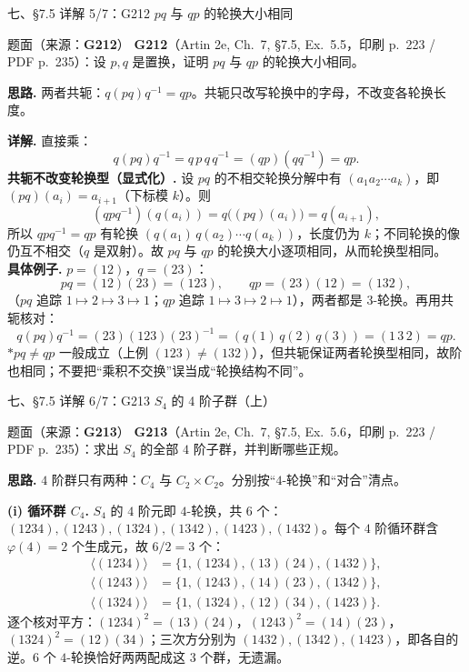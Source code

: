\documentclass[aspectratio=169,10pt,fontset=none]{ctexbeamer}
\newcommand{\ex}[1]{\textcolor{accent}{\footnotesize\bfseries #1}}
\newcommand{\key}[1]{\textcolor{ink}{\bfseries #1}}
\newcommand{\starpt}{\textcolor{accent}{\bfseries$\ast$}}
\begin{document}
\begin{frame}[t]{七、\S7.5 详解 5/7：G212 $pq$ 与 $qp$ 的轮换大小相同}
\label{ex:G212}
\scriptsize
\begin{block}{\footnotesize 题面（来源：\ex{G212}）}
\scriptsize
\ex{G212}（Artin 2e, Ch.~7, \S7.5, Ex.~5.5，印刷 p.~223 / PDF p.~235）：设 $p,q$ 是置换，证明 $pq$ 与 $qp$ 的轮换大小相同。
\end{block}
\key{思路.} 两者共轭：$q(pq)q^{-1}=qp$。共轭只改写轮换中的字母，不改变各轮换长度。

\key{详解.} 直接乘：
\[ q(pq)q^{-1}=q\,p\,q\,q^{-1}=(qp)(qq^{-1})=qp. \]
\key{共轭不改变轮换型（显式化）.} 设 $pq$ 的不相交轮换分解中有 $(a_1a_2\cdots a_k)$，即 $(pq)(a_i)=a_{i+1}$（下标模 $k$）。则
\[ (qpq^{-1})(q(a_i))=q\bigl((pq)(a_i)\bigr)=q(a_{i+1}), \]
所以 $qpq^{-1}=qp$ 有轮换 $(q(a_1)\,q(a_2)\cdots q(a_k))$，长度仍为 $k$；不同轮换的像仍互不相交（$q$ 是双射）。故 $pq$ 与 $qp$ 的轮换大小逐项相同，从而轮换型相同。\\
\key{具体例子.} $p=(12)$，$q=(23)$：
\[ pq=(12)(23)=(123),\qquad qp=(23)(12)=(132), \]
（$pq$ 追踪 $1\mapsto2\mapsto3\mapsto1$；$qp$ 追踪 $1\mapsto3\mapsto2\mapsto1$），两者都是 $3$-轮换。再用共轭核对：
\[ q(pq)q^{-1}=(23)(123)(23)^{-1}=(q(1)\,q(2)\,q(3))=(1\,3\,2)=qp. \]
\starpt $pq\ne qp$ 一般成立（上例 $(123)\ne(132)$），但共轭保证两者轮换型相同，故阶也相同；不要把“乘积不交换”误当成“轮换结构不同”。
\end{frame}

\begin{frame}[t]{七、\S7.5 详解 6/7：G213 $S_4$ 的 4 阶子群（上）}
\label{ex:G213}
\scriptsize
\begin{block}{\footnotesize 题面（来源：\ex{G213}）}
\scriptsize
\ex{G213}（Artin 2e, Ch.~7, \S7.5, Ex.~5.6，印刷 p.~223 / PDF p.~235）：求出 $S_4$ 的全部 $4$ 阶子群，并判断哪些正规。
\end{block}
\key{思路.} $4$ 阶群只有两种：$C_4$ 与 $C_2\times C_2$。分别按“$4$-轮换”和“对合”清点。

\key{(i) 循环群 $C_4$.} $S_4$ 的 $4$ 阶元即 $4$-轮换，共 $6$ 个：$(1234),(1243),(1324),(1342),(1423),(1432)$。每个 $4$ 阶循环群含 $\varphi(4)=2$ 个生成元，故 $6/2=3$ 个：
\[
\begin{aligned}
\langle(1234)\rangle&=\{1,(1234),(13)(24),(1432)\},\\
\langle(1243)\rangle&=\{1,(1243),(14)(23),(1342)\},\\
\langle(1324)\rangle&=\{1,(1324),(12)(34),(1423)\}.
\end{aligned}
\]
逐个核对平方：$(1234)^2=(13)(24)$，$(1243)^2=(14)(23)$，$(1324)^2=(12)(34)$；三次方分别为 $(1432),(1342),(1423)$，即各自的逆。$6$ 个 $4$-轮换恰好两两配成这 $3$ 个群，无遗漏。
\end{frame}
\end{document}
